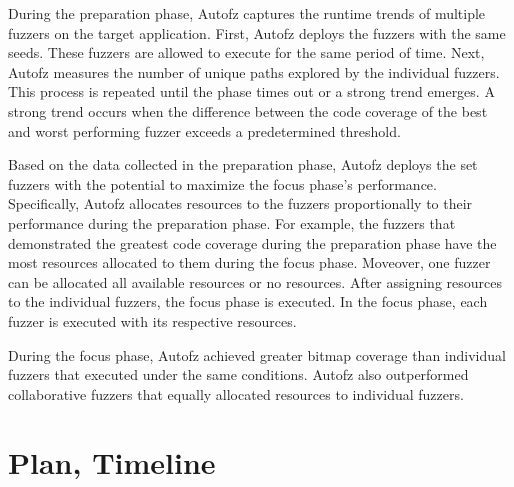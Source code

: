 During the preparation phase, Autofz captures the runtime trends of multiple fuzzers on the target application. First, Autofz deploys the fuzzers with the same seeds. These fuzzers are allowed to execute for the same period of time. Next, Autofz measures the number of unique paths explored by the individual fuzzers. This process is repeated until the phase times out or a strong trend emerges. A strong trend occurs when the difference between the code coverage of the best and worst performing fuzzer exceeds a predetermined threshold. 

Based on the data collected in the preparation phase, Autofz deploys the set fuzzers with the potential to maximize the focus phase’s performance. Specifically, Autofz allocates resources to the fuzzers proportionally to their performance during the preparation phase. For example, the fuzzers that demonstrated the greatest code coverage during the preparation phase have the most resources allocated to them during the focus phase. Moveover, one fuzzer can be allocated all available resources or no resources. After assigning resources to the individual fuzzers, the focus phase is executed. In the focus phase, each fuzzer is executed with its respective resources.

During the focus phase, Autofz achieved greater bitmap coverage than individual fuzzers that executed under the same conditions. Autofz also outperformed collaborative fuzzers that equally allocated resources to individual fuzzers. \cite{Fu}

\section{Plan, Timeline}






